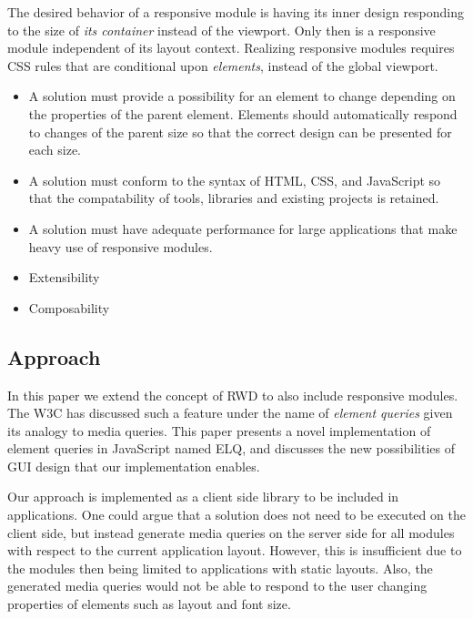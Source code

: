 \documentclass{acm_proc_article-sp}
\newcommand{\elq}{ELQ}
\begin{document}
      The desired behavior of a responsive module is having its inner design responding to the size of \emph{its container} instead of the viewport.
      Only then is a responsive module independent of its layout context.
      Realizing responsive modules requires CSS rules that are conditional upon \emph{elements}, instead of the global viewport.

      \begin{itemize}
        \item 
          A solution must provide a possibility for an element to change depending on the properties of the parent element.
          Elements should automatically respond to changes of the parent size so that the correct design can be presented for each size.
        \item
          A solution must conform to the syntax of HTML, CSS, and JavaScript so that the compatability of tools, libraries and existing projects is retained.
        \item
          A solution must have adequate performance for large applications that make heavy use of responsive modules.
        \item Extensibility
        \item Composability
      \end{itemize}

    \subsection{Approach}
      In this paper we extend the concept of RWD to also include responsive modules.
      The W3C has discussed such a feature under the name of \emph{element queries} given its analogy to media queries.
      This paper presents a novel implementation of element queries in JavaScript named \elq{}, and discusses the new possibilities of GUI design that our implementation enables.

      Our approach is implemented as a client side library to be included in applications.
      One could argue that a solution does not need to be executed on the client side, but instead generate media queries on the server side for all modules with respect to the current application layout.
      However, this is insufficient due to the modules then being limited to applications with static layouts.
      Also, the generated media queries would not be able to respond to the user changing properties of elements such as layout and font size.
\end{document}
